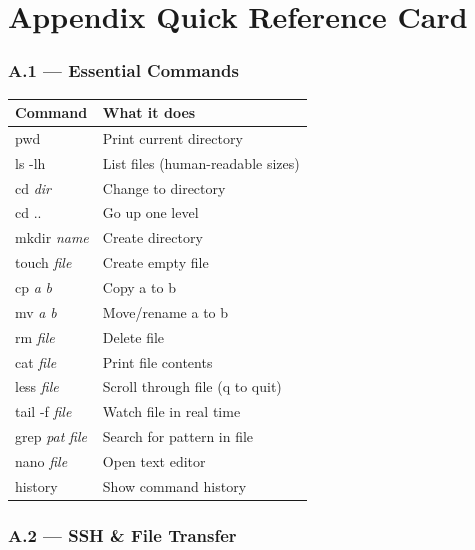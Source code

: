 \documentclass[12pt,a4paper]{article}
\begin{document}
\clearpage
\part*{Appendix \quad Quick Reference Card}

\section*{A.1 --- Essential Commands}

\begin{center}
\renewcommand{\arraystretch}{1.3}
\begin{tabular}{>{\ttfamily}lp{9cm}}
\toprule
\normalfont\textbf{Command} & \textbf{What it does} \\
\midrule
pwd              & Print current directory \\
ls -lh           & List files (human-readable sizes) \\
cd \textit{dir}        & Change to directory \\
cd ..            & Go up one level \\
mkdir \textit{name}    & Create directory \\
touch \textit{file}    & Create empty file \\
cp \textit{a} \textit{b}     & Copy a to b \\
mv \textit{a} \textit{b}     & Move/rename a to b \\
rm \textit{file}       & Delete file \\
cat \textit{file}      & Print file contents \\
less \textit{file}     & Scroll through file (q to quit) \\
tail -f \textit{file}  & Watch file in real time \\
grep \textit{pat} \textit{file} & Search for pattern in file \\
nano \textit{file}     & Open text editor \\
history          & Show command history \\
\bottomrule
\end{tabular}
\end{center}

\section*{A.2 --- SSH \& File Transfer}
\end{document}
